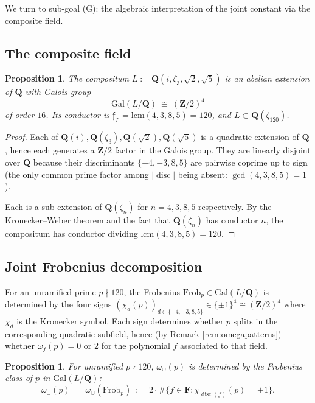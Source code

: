 \documentclass[11pt]{article}
\newtheorem{proposition}[theorem]{Proposition}
\theoremstyle{definition}
\newcommand{\Z}{\mathbf{Z}}
\newcommand{\Q}{\mathbf{Q}}
\newcommand{\F}{\mathbf{F}}
\newcommand{\F}{\mathcal{F}}
\DeclareMathOperator{\disc}{disc}
\begin{document}
We turn to sub-goal (G): the algebraic interpretation of the joint constant via the composite field.

\subsection{The composite field}

\begin{proposition}\label{prop:composite}
The compositum $L:=\Q(i,\zeta_3,\sqrt 2,\sqrt 5)$ is an abelian extension of $\Q$ with Galois group
\[
\mathrm{Gal}(L/\Q)\ \cong\ (\Z/2)^4
\]
of order $16$. Its conductor is $\mathfrak{f}_L=\mathrm{lcm}(4,3,8,5)=120$, and $L\subset\Q(\zeta_{120})$.
\end{proposition}

\begin{proof}
Each of $\Q(i),\Q(\zeta_3),\Q(\sqrt 2),\Q(\sqrt 5)$ is a quadratic extension of $\Q$, hence each generates a $\Z/2$ factor in the Galois group. They are linearly disjoint over $\Q$ because their discriminants $\{-4,-3,8,5\}$ are pairwise coprime up to sign (the only common prime factor among $|\disc|$ being absent: $\gcd(4,3,8,5)=1$).

Each is a sub-extension of $\Q(\zeta_n)$ for $n=4,3,8,5$ respectively. By the Kronecker--Weber theorem and the fact that $\Q(\zeta_n)$ has conductor $n$, the compositum has conductor dividing $\mathrm{lcm}(4,3,8,5)=120$.
\end{proof}

\subsection{Joint Frobenius decomposition}

For an unramified prime $p\nmid 120$, the Frobenius $\mathrm{Frob}_p\in\mathrm{Gal}(L/\Q)$ is determined by the four signs $(\chi_d(p))_{d\in\{-4,-3,8,5\}}\in\{\pm 1\}^4\cong(\Z/2)^4$ where $\chi_d$ is the Kronecker symbol. Each sign determines whether $p$ splits in the corresponding quadratic subfield, hence (by Remark \ref{rem:omegapatterns}) whether $\omega_f(p)=0$ or $2$ for the polynomial $f$ associated to that field.

\begin{proposition}\label{prop:joint-by-frob}
For unramified $p\nmid 120$, $\omega_\cup(p)$ is determined by the Frobenius class of $p$ in $\mathrm{Gal}(L/\Q)$:
\[
\omega_\cup(p)\ =\ \omega_\cup(\mathrm{Frob}_p)\ :=\ 2\cdot\#\{f\in\F : \chi_{\disc(f)}(p)=+1\}.
\]
\end{proposition}
\end{document}

